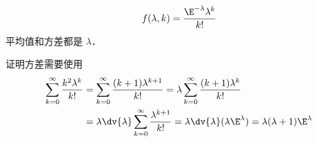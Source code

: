 
\begin{issues}
\issueDraft
\end{issues}

\begin{equation}
f(\lambda, k) = \frac{\E^{-\lambda}\lambda^k}{k!}
\end{equation}
平均值和方差都是 $\lambda$．

证明方差需要使用
\begin{equation}
\begin{aligned}
\sum_{k=0}^\infty \frac{k^2\lambda^{k}}{k!}
&= \sum_{k=0}^\infty \frac{(k+1)\lambda^{k+1}}{k!}
= \lambda \sum_{k=0}^\infty \frac{(k+1)\lambda^k}{k!}\\
&= \lambda\dv{\lambda} \sum_{k=0}^\infty \frac{\lambda^{k+1}}{k!}
= \lambda \dv{\lambda} (\lambda \E^{\lambda})
= \lambda(\lambda+1)\E^{\lambda}
\end{aligned}
\end{equation}

